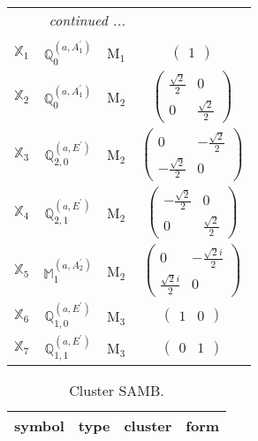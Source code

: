 \documentclass[fleqn,10pt,landscape]{article}
\begin{document}
\begin{itemize}
\begin{center}
\begin{longtable}{c|c|c|c}
 \hline \hline
\multicolumn{3}{r}{\footnotesize\it continued ...} \\ \endfoot

 \hline \hline
\multicolumn{3}{r}{} \\ \endlastfoot

$ \mathbb{X}_{1} $ & $\mathbb{Q}_{0}^{(a,A_{1}^{\prime})}$ & M$_{1}$ & $\begin{pmatrix} 1 \end{pmatrix}$ \\ \hline
$ \mathbb{X}_{2} $ & $\mathbb{Q}_{0}^{(a,A_{1}^{\prime})}$ & M$_{2}$ & $\begin{pmatrix} \frac{\sqrt{2}}{2} & 0 \\ 0 & \frac{\sqrt{2}}{2} \end{pmatrix}$ \\
$ \mathbb{X}_{3} $ & $\mathbb{Q}_{2,0}^{(a,E^{\prime})}$ & M$_{2}$ & $\begin{pmatrix} 0 & - \frac{\sqrt{2}}{2} \\ - \frac{\sqrt{2}}{2} & 0 \end{pmatrix}$ \\
$ \mathbb{X}_{4} $ & $\mathbb{Q}_{2,1}^{(a,E^{\prime})}$ & M$_{2}$ & $\begin{pmatrix} - \frac{\sqrt{2}}{2} & 0 \\ 0 & \frac{\sqrt{2}}{2} \end{pmatrix}$ \\
$ \mathbb{X}_{5} $ & $\mathbb{M}_{1}^{(a,A_{2}^{\prime})}$ & M$_{2}$ & $\begin{pmatrix} 0 & - \frac{\sqrt{2} i}{2} \\ \frac{\sqrt{2} i}{2} & 0 \end{pmatrix}$ \\ \hline
$ \mathbb{X}_{6} $ & $\mathbb{Q}_{1,0}^{(a,E^{\prime})}$ & M$_{3}$ & $\begin{pmatrix} 1 & 0 \end{pmatrix}$ \\
$ \mathbb{X}_{7} $ & $\mathbb{Q}_{1,1}^{(a,E^{\prime})}$ & M$_{3}$ & $\begin{pmatrix} 0 & 1 \end{pmatrix}$ \\
\end{longtable}
\end{center}
\begin{center}
\renewcommand{\arraystretch}{1.3}
\begin{longtable}{c|c|c|c}
\caption{Cluster SAMB.}
 \\
 \hline \hline
symbol & type & cluster & form \\ \hline \endfirsthead


\end{longtable}
\end{center}
\end{itemize}
\end{document}
